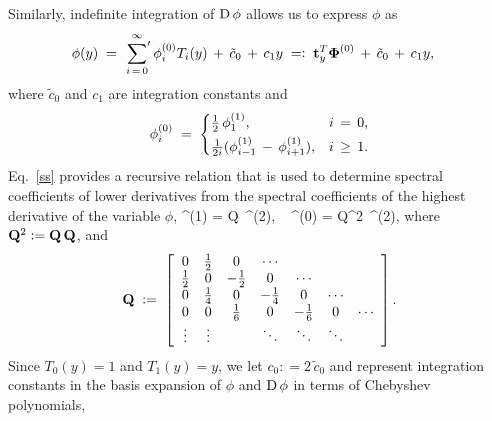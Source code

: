 \documentclass[%
secnumarabic,%
 amssymb, amsmath,%
 aps,prf,superscriptaddress,longbibliography
frontmatterverbose,
]{revtex4-2}
\newcommand{\DefinedAs}[0]{\mathrel{\mathop:}=}
\newcommand{\AsDefined}[0]{=\mathrel{\mathop:}}
\begin{document}
Similarly, indefinite integration of $\mathrm D \, \phi$ allows us to express $\phi$ as
	\begin{align*}
  	\phi (y) 
	\;&=\; 
	\sideset{}{'}\sum_{i \, = \, 0}^{\infty} 
	\phi_i^{(0)} T_i(y) \,+ \, \tilde{c}_0 \, + \,c_1 y
	 \; \AsDefined \;
	  \HH t_y^T \BB \Phi^{(0)} 
	  \,+\, 
	 \tilde{c}_0 \, + \,c_1 y,
\end{align*}
where $\tilde{c}_0$ and $c_1$ are integration constants and 
\begin{equation}
  \phi_i^{(0)} \;=\;
  \begin{cases}
    \tfrac{1}{2} \, \phi_1^{(1)}, & i \, = \, 0,
    \\[0.1cm]
  \tfrac{1}{2i} (\phi_{i-1}^{(1)}\,-\,\phi_{i+1}^{(1)}), &  i \, \geq \, 1.
  \end{cases}
  \nonumber
  \end{equation}
Eq.~\eqref{ss} provides a recursive relation that is used to determine spectral coefficients of lower derivatives from the spectral coefficients of the highest derivative of the variable $\phi$,
	\be
	\BB \Phi^{(1)}
	\; = \;
	\HH Q \,\BB \Phi^{(2)},
	~
	\BB \Phi^{(0)}
	\; = \;
	\HH Q^2\, \BB \Phi^{(2)},
	\non
	\ee
where $\HH Q^2 \DefinedAs \HH Q\, \HH Q$, and
\begin{equation}\label{eq:Q}
  \HH Q \;\DefinedAs\; \left[\begin{array}{ccccccc}
     0& \tfrac{1}{2} & 0 & \cdots\\
    \tfrac{1}{2} & 0 & -\tfrac{1}{2} & 0 &\cdots \\
    0 & \tfrac{1}{4} & 0 & -\tfrac{1}{4} & 0 &\cdots \\
    0 & 0 & \tfrac{1}{6} & 0 & -\tfrac{1}{6} & 0 &\cdots \\
    \vdots & \vdots &  & \ddots & \ddots & \ddots & \\
  \end{array}\right].
\end{equation}
Since $T_0(y) = 1$ and $T_1(y) = y$, we let $c_0 \DefinedAs 2 \,\tilde{c}_0$ and represent integration constants in the basis expansion of $\phi$ and $\mathrm D \, \phi$ in terms of Chebyshev polynomials,
\end{document}
